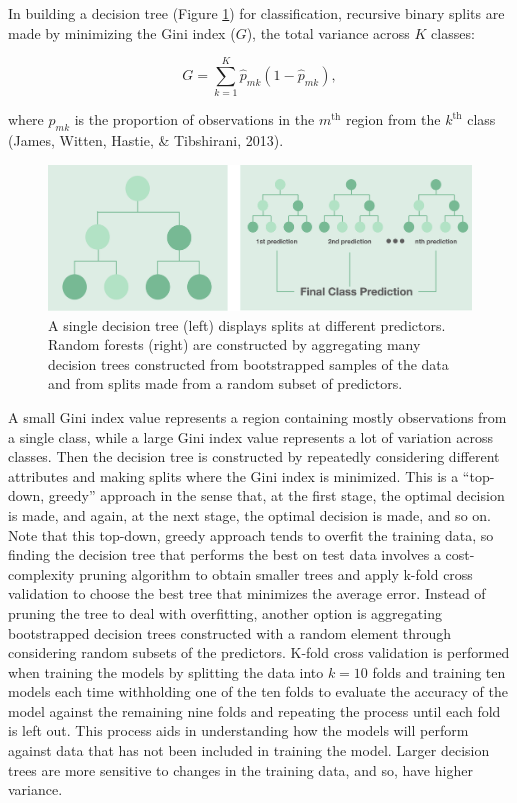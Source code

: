 \documentclass[12pt,twoside]{reedthesis}
\begin{document}
In building a decision tree (Figure \ref{fig:decisiontree}) for classification, recursive binary splits are made by minimizing the Gini index (\(G\)), the total variance across \(K\) classes:

\[G = \sum_{k = 1}^K\hat{p}_{mk}(1 - \hat{p}_{mk}),\]

where \(\hat{p}_{mk}\) is the proportion of observations in the \(m^{\text{th}}\) region from the \(k^{\text{th}}\) class (James, Witten, Hastie, \& Tibshirani, 2013).
\begin{figure}

{\centering \includegraphics[width=0.7\linewidth]{figure/decision_tree} 

}

\caption{A single decision tree (left) displays splits at different predictors. Random forests (right) are constructed by aggregating many decision trees constructed from bootstrapped samples of the data and from splits made from a random subset of predictors.}\label{fig:decisiontree}
\end{figure}
A small Gini index value represents a region containing mostly observations from a single class, while a large Gini index value represents a lot of variation across classes. Then the decision tree is constructed by repeatedly considering different attributes and making splits where the Gini index is minimized. This is a ``top-down, greedy'' approach in the sense that, at the first stage, the optimal decision is made, and again, at the next stage, the optimal decision is made, and so on. Note that this top-down, greedy approach tends to overfit the training data, so finding the decision tree that performs the best on test data involves a cost-complexity pruning algorithm to obtain smaller trees and apply k-fold cross validation to choose the best tree that minimizes the average error. Instead of pruning the tree to deal with overfitting, another option is aggregating bootstrapped decision trees constructed with a random element through considering random subsets of the predictors. K-fold cross validation is performed when training the models by splitting the data into \(k = 10\) folds and training ten models each time withholding one of the ten folds to evaluate the accuracy of the model against the remaining nine folds and repeating the process until each fold is left out. This process aids in understanding how the models will perform against data that has not been included in training the model. Larger decision trees are more sensitive to changes in the training data, and so, have higher variance.
\end{document}
